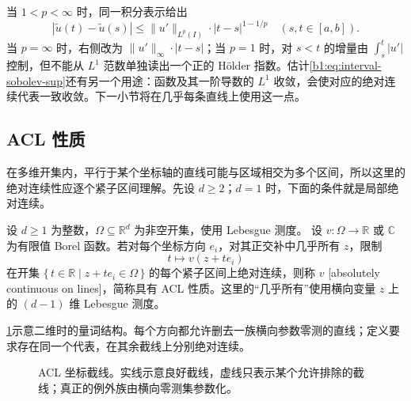 当 \(1<p<\infty\) 时，同一积分表示给出
\[
 |\widetilde u(t)-\widetilde u(s)|
 \leq\|u'\|_{L^p(I)}\cdot|t-s|^{1-1/p}
 \quad(s,t\in[a,b]).
\]
当 \(p=\infty\) 时，右侧改为 \(\|u'\|_\infty\cdot|t-s|\)；当 \(p=1\) 时，对 \(s<t\) 的增量由 \(\int_s^t|u'|\) 控制，但不能从 \(L^1\) 范数单独读出一个正的 Hölder 指数。估计\eqref{b1:eq:interval-sobolev-sup}还有另一个用途：函数及其一阶导数的 \(L^1\) 收敛，会使对应的绝对连续代表一致收敛。下一小节将在几乎每条直线上使用这一点。

\subsection{ACL 性质}
\label{b1:subsec:210402}

在多维开集内，平行于某个坐标轴的直线可能与区域相交为多个区间，所以这里的绝对连续性应逐个紧子区间理解。先设 \(d\geq2\)；\(d=1\) 时，下面的条件就是局部绝对连续。

\begin{definition}\label{b1:def:acl}
设 \(d\geq1\) 为整数，\(\Omega\subseteq\mathbb R^d\) 为非空开集，使用 Lebesgue 测度。
设 \(v:\Omega\rightarrow\mathbb R\text{ 或 }\mathbb C\) 为有限值 Borel 函数。若对每个坐标方向 \(e_i\)，对其正交补中几乎所有 \(z\)，限制
\[
 t\longmapsto v(z+te_i)
\]
在开集 \(\{\,t\in\mathbb R\mid z+te_i\in\Omega\,\}\) 的每个紧子区间上绝对连续，则称 \(v\) [absolutely continuous on lines]，简称具有 ACL 性质。这里的“几乎所有”使用横向变量 \(z\) 上的 \((d-1)\) 维 Lebesgue 测度。
\end{definition}

\cref{b1:fig:acl-coordinate-lines}示意二维时的量词结构。每个方向都允许删去一族横向参数零测的直线；定义要求存在同一个代表，在其余截线上分别绝对连续。
\begin{figure}[htbp]
  \centering
  \caption[ACL 坐标截线]{ACL 坐标截线。实线示意良好截线，虚线只表示某个允许排除的截线；真正的例外族由横向零测集参数化。}
  \label{b1:fig:acl-coordinate-lines}
\end{figure}


